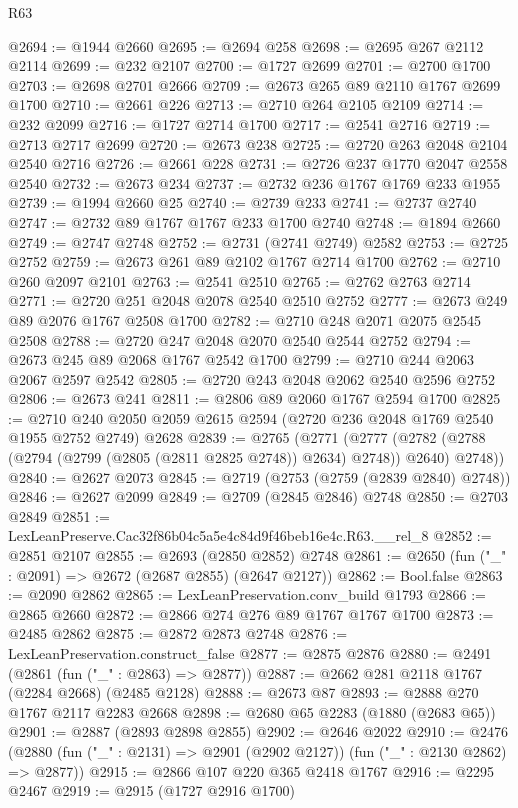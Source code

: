 \begin{lexlean}{R63}
\begin{coremodule}
@2694 := @1944 @2660
@2695 := @2694 @258
@2698 := @2695 @267 @2112 @2114
@2699 := @232 @2107
@2700 := @1727 @2699
@2701 := @2700 @1700
@2703 := @2698 @2701 @2666
@2709 := @2673 @265 @89 @2110 @1767 @2699 @1700
@2710 := @2661 @226
@2713 := @2710 @264 @2105 @2109
@2714 := @232 @2099
@2716 := @1727 @2714 @1700
@2717 := @2541 @2716
@2719 := @2713 @2717 @2699
@2720 := @2673 @238
@2725 := @2720 @263 @2048 @2104 @2540 @2716
@2726 := @2661 @228
@2731 := @2726 @237 @1770 @2047 @2558 @2540
@2732 := @2673 @234
@2737 := @2732 @236 @1767 @1769 @233 @1955
@2739 := @1994 @2660 @25
@2740 := @2739 @233
@2741 := @2737 @2740
@2747 := @2732 @89 @1767 @1767 @233 @1700 @2740
@2748 := @1894 @2660
@2749 := @2747 @2748
@2752 := @2731 (@2741 @2749) @2582
@2753 := @2725 @2752
@2759 := @2673 @261 @89 @2102 @1767 @2714 @1700
@2762 := @2710 @260 @2097 @2101
@2763 := @2541 @2510
@2765 := @2762 @2763 @2714
@2771 := @2720 @251 @2048 @2078 @2540 @2510 @2752
@2777 := @2673 @249 @89 @2076 @1767 @2508 @1700
@2782 := @2710 @248 @2071 @2075 @2545 @2508
@2788 := @2720 @247 @2048 @2070 @2540 @2544 @2752
@2794 := @2673 @245 @89 @2068 @1767 @2542 @1700
@2799 := @2710 @244 @2063 @2067 @2597 @2542
@2805 := @2720 @243 @2048 @2062 @2540 @2596 @2752
@2806 := @2673 @241
@2811 := @2806 @89 @2060 @1767 @2594 @1700
@2825 := @2710 @240 @2050 @2059 @2615 @2594 (@2720 @236 @2048 @1769 @2540 @1955 @2752 @2749) @2628
@2839 := @2765
    (@2771
      (@2777 (@2782 (@2788 (@2794 (@2799 (@2805 (@2811 @2825 @2748)) @2634) @2748)) @2640) @2748))
@2840 := @2627 @2073
@2845 := @2719 (@2753 (@2759 (@2839 @2840) @2748))
@2846 := @2627 @2099
@2849 := @2709 (@2845 @2846) @2748
@2850 := @2703 @2849
@2851 := LexLeanPreserve.Cac32f86b04c5a5e4c84d9f46beb16e4c.R63.__rel_8
@2852 := @2851 @2107
@2855 := @2693 (@2850 @2852) @2748
@2861 := @2650 (fun ("_" : @2091) => @2672 (@2687 @2855) (@2647 @2127))
@2862 := Bool.false
@2863 := @2090 @2862
@2865 := LexLeanPreservation.conv_build @1793
@2866 := @2865 @2660
@2872 := @2866 @274 @276 @89 @1767 @1767 @1700
@2873 := @2485 @2862
@2875 := @2872 @2873 @2748
@2876 := LexLeanPreservation.construct_false
@2877 := @2875 @2876
@2880 := @2491 (@2861 (fun ("_" : @2863) => @2877))
@2887 := @2662 @281 @2118 @1767 (@2284 @2668) (@2485 @2128)
@2888 := @2673 @87
@2893 := @2888 @270 @1767 @2117 @2283 @2668
@2898 := @2680 @65 @2283 (@1880 (@2683 @65))
@2901 := @2887 (@2893 @2898 @2855)
@2902 := @2646 @2022
@2910 := @2476 (@2880 (fun ("_" : @2131) => @2901 (@2902 @2127)) (fun ("_" : @2130 @2862) => @2877))
@2915 := @2866 @107 @220 @365 @2418 @1767
@2916 := @2295 @2467
@2919 := @2915 (@1727 @2916 @1700)

\end{coremodule}
\end{lexlean}
